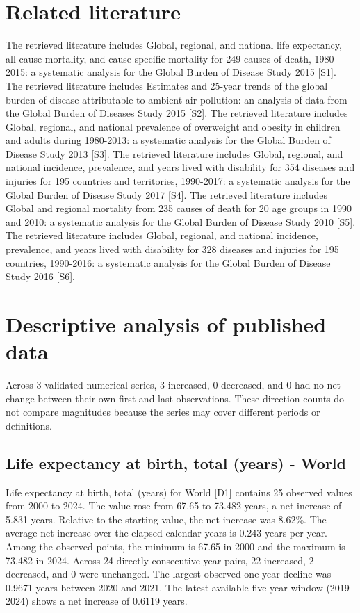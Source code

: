\documentclass[10pt,a4paper]{article}
\begin{document}
\section{Related literature}
The retrieved literature includes Global, regional, and national life expectancy, all-cause mortality, and cause-specific mortality for 249 causes of death, 1980-2015: a systematic analysis for the Global Burden of Disease Study 2015 [S1]. The retrieved literature includes Estimates and 25-year trends of the global burden of disease attributable to ambient air pollution: an analysis of data from the Global Burden of Diseases Study 2015 [S2]. The retrieved literature includes Global, regional, and national prevalence of overweight and obesity in children and adults during 1980-2013: a systematic analysis for the Global Burden of Disease Study 2013 [S3]. The retrieved literature includes Global, regional, and national incidence, prevalence, and years lived with disability for 354 diseases and injuries for 195 countries and territories, 1990-2017: a systematic analysis for the Global Burden of Disease Study 2017 [S4]. The retrieved literature includes Global and regional mortality from 235 causes of death for 20 age groups in 1990 and 2010: a systematic analysis for the Global Burden of Disease Study 2010 [S5]. The retrieved literature includes Global, regional, and national incidence, prevalence, and years lived with disability for 328 diseases and injuries for 195 countries, 1990-2016: a systematic analysis for the Global Burden of Disease Study 2016 [S6].
\section{Descriptive analysis of published data}
Across 3 validated numerical series, 3 increased, 0 decreased, and 0 had no net change between their own first and last observations. These direction counts do not compare magnitudes because the series may cover different periods or definitions.
\subsection*{Life expectancy at birth, total (years) - World}
Life expectancy at birth, total (years) for World [D1] contains 25 observed values from 2000 to 2024. The value rose from 67.65 to 73.482 years, a net increase of 5.831 years. Relative to the starting value, the net increase was 8.62\%. The average net increase over the elapsed calendar years is 0.243 years per year. Among the observed points, the minimum is 67.65 in 2000 and the maximum is 73.482 in 2024. Across 24 directly consecutive-year pairs, 22 increased, 2 decreased, and 0 were unchanged. The largest observed one-year decline was 0.9671 years between 2020 and 2021. The latest available five-year window (2019-2024) shows a net increase of 0.6119 years.
\end{document}

